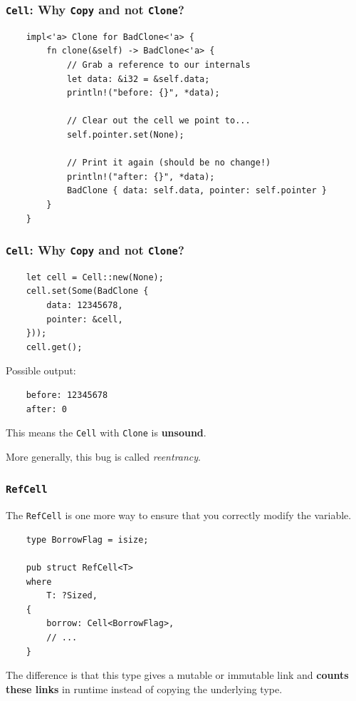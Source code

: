 \documentclass[aspectratio=1610,t]{beamer}
\begin{document}

\begin{frame}[fragile]
\frametitle{\texttt{Cell}: Why \texttt{Copy} and not \texttt{Clone}?}
\begin{verbatim}
    impl<'a> Clone for BadClone<'a> {
        fn clone(&self) -> BadClone<'a> {
            // Grab a reference to our internals
            let data: &i32 = &self.data;
            println!("before: {}", *data);
            
            // Сlear out the cell we point to...
            self.pointer.set(None);
            
            // Print it again (should be no change!)
            println!("after: {}", *data);
            BadClone { data: self.data, pointer: self.pointer }
        }
    }
\end{verbatim}
\end{frame}


\begin{frame}[fragile]
\frametitle{\texttt{Cell}: Why \texttt{Copy} and not \texttt{Clone}?}
\begin{verbatim}
    let cell = Cell::new(None);
    cell.set(Some(BadClone {
        data: 12345678,
        pointer: &cell,
    }));
    cell.get();
\end{verbatim}

Possible output:

\begin{verbatim}
    before: 12345678
    after: 0
\end{verbatim}

This means the \texttt{Cell} with \texttt{Clone} is \textbf{unsound}.

More generally, this bug is called \textit{reentrancy}.
\end{frame}


\begin{frame}[fragile]
\frametitle{\texttt{RefCell}}
The \texttt{RefCell} is one more way to ensure that you correctly modify the variable.

\begin{verbatim}
    type BorrowFlag = isize;

    pub struct RefCell<T> 
    where
        T: ?Sized, 
    {
        borrow: Cell<BorrowFlag>,
        // ... 
    }
\end{verbatim}

The difference is that this type gives a mutable or immutable link and \textbf{counts these links} in runtime instead of copying the underlying type.
\end{frame}
\end{document}
